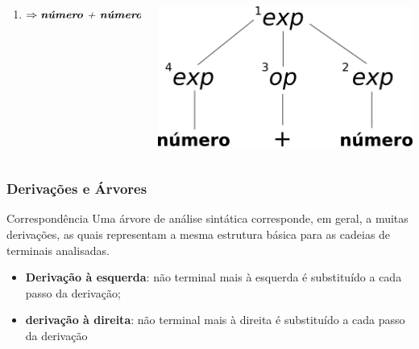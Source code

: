 \documentclass[table]{beamer}
\begin{document}
\begin{frame}
\begin{columns}
\begin{column}{0.5\textwidth}
\begin{enumerate}
      \item \hspace{0.5cm} $\Rightarrow \textit{\textbf{número} + \textbf{número}}$
   \end{enumerate}
   \end{column}
   \begin{column}{0.5\textwidth}
   \includegraphics[width=\linewidth,height=\textheight,keepaspectratio]{figuras/terceira_arvore.png}
   \end{column}
   \end{columns}
\end{frame}

\begin{frame}
   \frametitle{Derivações e Árvores}
   \begin{block}{Correspondência}
   Uma árvore de análise sintática corresponde, em geral, a muitas derivações, as quais representam a mesma estrutura básica para as cadeias de terminais analisadas.
      \begin{itemize}
         \item \textbf{Derivação à esquerda}: não terminal mais à esquerda é substituído a cada passo da derivação; 
         \item \textbf{derivação à direita}: não terminal mais à direita é substituído a cada passo da derivação
      \end{itemize}
   \end{block}
\end{frame}
\end{document}

